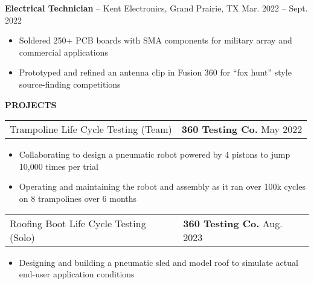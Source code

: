 \documentclass[18pt]{article}
\begin{document}
\vspace{-0.5\baselineskip}
\textbf{Electrical Technician} – Kent Electronics, Grand Prairie, TX \hfill Mar. 2022 – Sept. 2022

\begin{itemize}[noitemsep]
    \vspace{-0.75\baselineskip}
    \item Soldered 250+ PCB boards with SMA components for military array and commercial applications
    \item Prototyped and refined an antenna clip in Fusion 360 for “fox hunt” style source-finding competitions 
\end{itemize}



\vspace{-1.25\baselineskip}
\begin{center}
    \textbf{PROJECTS}
    \hrulefill
\end{center}
\vspace{-0.5\baselineskip}


\begin{tabular}{p{} p{} }
    Trampoline Life Cycle Testing (Team) 
    &
    \textbf{360 Testing Co.} \hfill May 2022
\end{tabular}

\vspace{-0.5\baselineskip}
\begin{itemize}[noitemsep]
    
    \item Collaborating to design a pneumatic robot powered by 4 pistons to jump 10,000 times per trial
    \item Operating and maintaining the robot and assembly as it ran over 100k cycles on 8 trampolines over 6 months
\end{itemize}

\vspace{-0.5\baselineskip}
\begin{tabular}{p{} p{} }
    Roofing Boot Life Cycle Testing (Solo)
    &
    \textbf{360 Testing Co.}
    \hfill Aug. 2023
\end{tabular}

\vspace{-0.5\baselineskip}
\begin{itemize}[noitemsep]
    \item Designing and building a pneumatic sled and model roof to simulate actual end-user application conditions 
\end{itemize}
\end{document}
